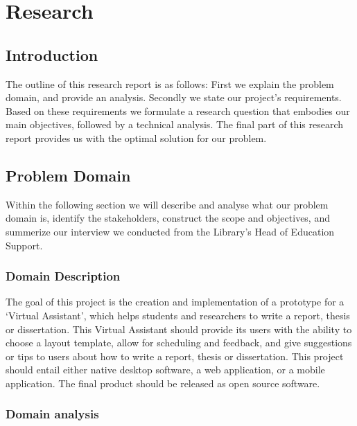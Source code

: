 \chapter{Research}

\section{Introduction}

The outline of this research report is as follows: First we explain the problem domain, and provide an analysis. Secondly we state our project's requirements. Based on these requirements we formulate a research question that embodies our main objectives, followed by a technical analysis. The final part of this research report provides us with the optimal solution for our problem.


\section{Problem Domain} %
\label{sec:problem_domain}


Within the following section we will describe and analyse what our problem domain is, identify the stakeholders, construct the scope and objectives, and summerize our interview we conducted from the Library's Head of Education Support.

\subsection{Domain Description} %
\label{sub:problem_description}

The goal of this project is the creation and implementation of a prototype for a `Virtual Assistant', which helps students and researchers to write a report, thesis or dissertation. This Virtual Assistant should provide its users with the ability to choose a layout template, allow for scheduling and feedback, and give suggestions or tips to users about how to write a report, thesis or dissertation.
This project should entail either native desktop software, a web application, or a mobile application. The final product should be released as open source software.

\subsection{Domain analysis} %

